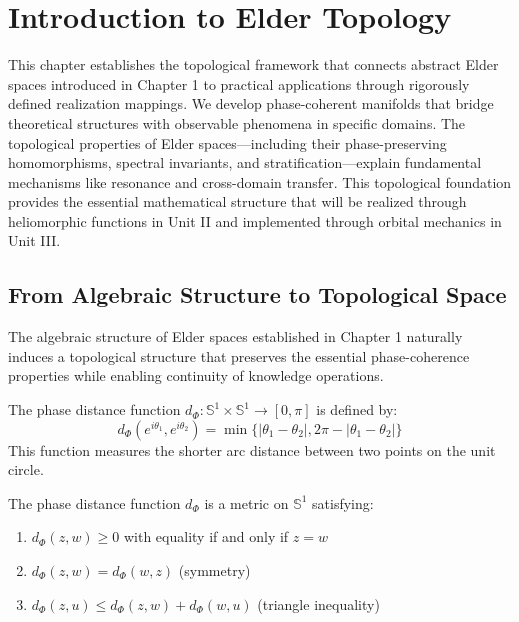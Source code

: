 \chapter{Introduction to Elder Topology}

\begin{tcolorbox}[colback=DarkSkyBlue!5!white,colframe=DarkSkyBlue!75!black,title=Chapter Summary]
This chapter establishes the topological framework that connects abstract Elder spaces introduced in Chapter 1 to practical applications through rigorously defined realization mappings. We develop phase-coherent manifolds that bridge theoretical structures with observable phenomena in specific domains. The topological properties of Elder spaces—including their phase-preserving homomorphisms, spectral invariants, and stratification—explain fundamental mechanisms like resonance and cross-domain transfer. This topological foundation provides the essential mathematical structure that will be realized through heliomorphic functions in Unit II and implemented through orbital mechanics in Unit III.
\end{tcolorbox}

\section{From Algebraic Structure to Topological Space}

The algebraic structure of Elder spaces established in Chapter 1 naturally induces a topological structure that preserves the essential phase-coherence properties while enabling continuity of knowledge operations.

\begin{definition}
The phase distance function $d_{\Phi}: \mathbb{S}^1 \times \mathbb{S}^1 \rightarrow [0, \pi]$ is defined by:
\begin{equation}
d_{\Phi}(e^{i\theta_1}, e^{i\theta_2}) = \min\{|\theta_1 - \theta_2|, 2\pi - |\theta_1 - \theta_2|\}
\end{equation}
This function measures the shorter arc distance between two points on the unit circle.
\end{definition}

\begin{proposition}
The phase distance function $d_{\Phi}$ is a metric on $\mathbb{S}^1$ satisfying:
\begin{enumerate}
    \item $d_{\Phi}(z, w) \geq 0$ with equality if and only if $z = w$
    \item $d_{\Phi}(z, w) = d_{\Phi}(w, z)$ (symmetry)
    \item $d_{\Phi}(z, u) \leq d_{\Phi}(z, w) + d_{\Phi}(w, u)$ (triangle inequality)
\end{enumerate}
\end{proposition}

